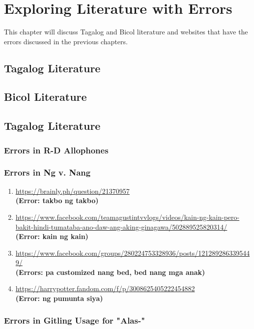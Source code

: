 \chapter{Exploring Literature with Errors}

This chapter will discuss Tagalog and Bicol literature and websites that have the errors discussed in the previous chapters.

\section{Tagalog Literature}

\section{Bicol Literature}


\section{Tagalog Literature}
\subsection{Errors in R-D Allophones}
\subsection{Errors in Ng v. Nang}

\begin{enumerate}
    \item \url{https://brainly.ph/question/21370957} \\
    \textbf{(Error: takbo ng takbo)}
    \item \url{https://www.facebook.com/teamagustintvvlogs/videos/kain-ng-kain-pero-bakit-hindi-tumataba-ano-daw-ang-aking-ginagawa/502889525820314/} \\
    \textbf{(Error: kain ng kain)}
    \item \url{https://www.facebook.com/groups/280224753328936/posts/1212892863395449/} \\
    \textbf{(Errors: pa customized nang bed, bed nang mga anak)}
    \item \url{https://harrypotter.fandom.com/f/p/3008625405222454882} \\
    \textbf{(Error: ng pumunta siya)}
\end{enumerate}

\subsection{Errors in Gitling Usage for "Alas-"}

